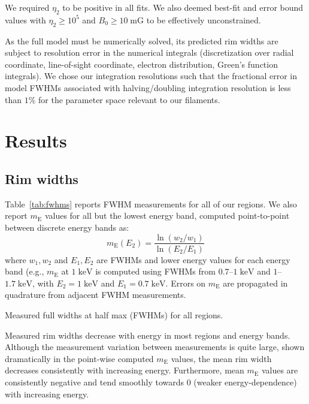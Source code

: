 \documentclass[iop, apj, numberedappendix, twocolappendix]{emulateapj}
\newcommand*{\mt}{\mathrm}
\newcommand*{\unit}[1]{\;\mt{#1}}  %
\newcommand*{\mE}{m_\mt{E}}
\begin{document}
We required $\eta_2$ to be positive in all fits.  We also deemed
best-fit and error bound values with $\eta_2 \geq 10^5$ and $B_0 \geq 10
\unit{mG}$ to be effectively unconstrained. %

As the full model must be numerically solved, its predicted rim widths are
subject to resolution error in the numerical integrals (discretization over
radial coordinate, line-of-sight coordinate, electron distribution, Green's
function integrals).  We chose our integration resolutions such that the
fractional error in model FWHMs associated with halving/doubling integration
resolution is less than $1\%$ for the parameter space relevant to our
filaments.

\section{Results}

\subsection{Rim widths}
\label{sec:fwhm-results}

Table~\ref{tab:fwhms} reports FWHM measurements for all of our regions.
We also report $\mE$ values for all but the lowest energy band, computed
point-to-point between discrete energy bands as:
\begin{equation}
    \mE(E_2) = \frac{\ln(w_2/w_1)}{\ln(E_2/E_1)}
\end{equation}
where $w_1, w_2$ and $E_1, E_2$ are FWHMs and lower energy values for each
energy band (e.g., $\mE$ at $1 \unit{keV}$ is computed using FWHMs from
$0.7$--$1 \unit{keV}$ and $1$--$1.7 \unit{keV}$, with $E_2 = 1
\unit{keV}$ and $E_1 = 0.7 \unit{keV}$.  Errors on $\mE$ are propagated in
quadrature from adjacent FWHM measurements.

\begin{table*}[ht]
    \scriptsize
    \centering
    \caption{Measured full widths at half max (FWHMs) for all regions.
             \label{tab:fwhms}}
    
\end{table*}

Measured rim widths decrease with energy in most regions and energy bands.
Although the measurement variation between measurements is quite large, shown
dramatically in the point-wise computed $\mE$ values, the mean rim width
decreases consistently with increasing energy.  Furthermore, mean $\mE$ values
are consistently negative and tend smoothly towards $0$ (weaker
energy-dependence) with increasing energy.
\end{document}
